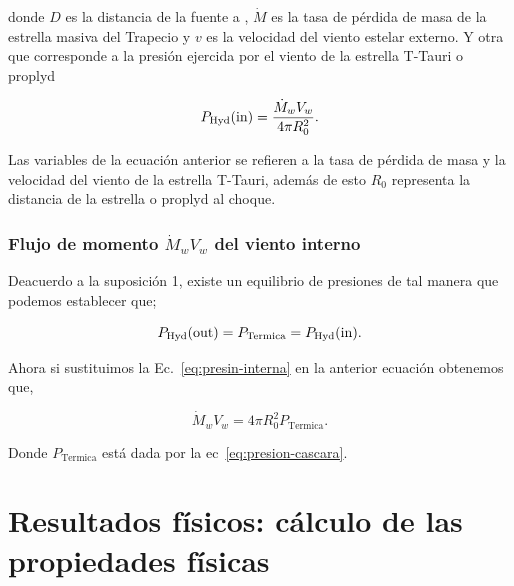 donde \(D\) es la distancia de la fuente a \thC{}, \(\dot{M}\) es la tasa de pérdida de masa de la estrella masiva del Trapecio y \(v\) es la velocidad del viento estelar externo. Y otra que corresponde a la presión ejercida por el viento de la estrella T-Tauri o proplyd

 
\begin{equation}
  \label{eq:presion-interna}
  P_{\text{Hyd}}(\mathrm{in}{})=\frac{\dot{M}_{w} V_{w}}{4 \pi R_{0}^{2}}.
\end{equation}

Las variables de la ecuación anterior se refieren a la tasa de pérdida de masa y la velocidad del viento de la estrella T-Tauri, además de esto \(R_{0}\) representa la distancia de la estrella o proplyd al choque.

\subsubsection{Flujo de momento \(\dot{M}_{w}V_{w}\) del viento interno}
\label{sec:momento}

Deacuerdo a la suposición 1, existe un equilibrio de presiones de tal manera que podemos establecer que;
 
\begin{equation}
  \label{eq:igualda-presion}
  P_{\text{Hyd}}(\mathrm{out}{})=P_{\text{Termica}}=P_{\text{Hyd}}(\mathrm{in}{}).
\end{equation}

Ahora si sustituimos la Ec.~\ref{eq:presin-interna} en la anterior ecuación obtenemos que,

\begin{equation}
  \label{eq:momentum}
   \dot{M}_{w}V_{w} = 4 \pi  R_{0}^{2}  P_{\text{Termica}}. 
\end{equation}

Donde \(P_{\text{Termica}}\) está dada por la ec~\ref{eq:presion-cascara}. 

\section{Resultados físicos: cálculo de las propiedades físicas }
\label{sec:results}


